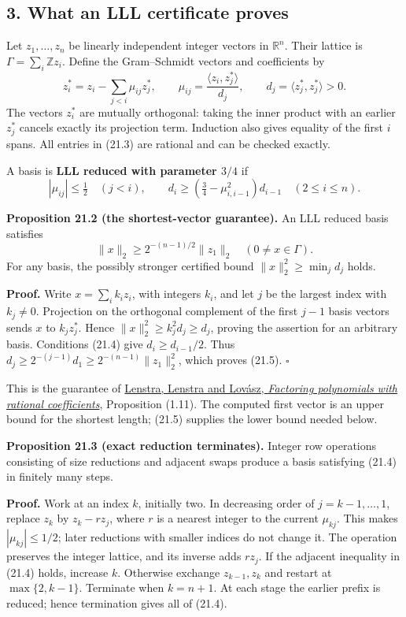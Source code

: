 \documentclass[
  11pt,
  a4paper,
]{article}
\begin{document}
\subsection{3. What an LLL certificate
proves}\label{what-an-lll-certificate-proves}

Let \(z_1,\ldots,z_n\) be linearly independent integer vectors in
\(\mathbb R^n\). Their lattice is \(\Gamma=\sum_i\mathbb Zz_i\). Define
the Gram--Schmidt vectors and coefficients by \[
 z_i^*=z_i-\sum_{j<i}\mu_{ij}z_j^*,\qquad
 \mu_{ij}=\frac{\langle z_i,z_j^*\rangle}{d_j},\qquad
 d_j=\langle z_j^*,z_j^*\rangle>0.
 \tag{21.3}
\] The vectors \(z_i^*\) are mutually orthogonal: taking the inner
product with an earlier \(z_j^*\) cancels exactly its projection term.
Induction also gives equality of the first \(i\) spans. All entries in
(21.3) are rational and can be checked exactly.

A basis is \textbf{LLL reduced with parameter \(3/4\)} if \[
 |\mu_{ij}|\le\tfrac12\quad(j<i),\qquad
 d_i\ge(\tfrac34-\mu_{i,i-1}^2)d_{i-1}\quad(2\le i\le n).
 \tag{21.4}
\]

\textbf{Proposition 21.2 (the shortest-vector guarantee).} An LLL
reduced basis satisfies \[
 \|x\|_2\ge2^{-(n-1)/2}\|z_1\|_2
       \quad(0\ne x\in\Gamma).
 \tag{21.5}
\] For any basis, the possibly stronger certified bound
\(\|x\|_2^2\ge\min_jd_j\) holds.

\textbf{Proof.} Write \(x=\sum_i k_i z_i\), with integers \(k_i\), and
let \(j\) be the largest index with \(k_j\ne0\). Projection on the
orthogonal complement of the first \(j-1\) basis vectors sends \(x\) to
\(k_jz_j^*\). Hence \(\|x\|_2^2\ge k_j^2d_j\ge d_j\), proving the
assertion for an arbitrary basis. Conditions (21.4) give
\(d_i\ge d_{i-1}/2\). Thus
\(d_j\ge2^{-(j-1)}d_1\ge2^{-(n-1)}\|z_1\|_2^2\), which proves (21.5).
\(\square\)

This is the guarantee of
\href{https://www.math.ucdavis.edu/~deloera/MISC/LA-BIBLIO/trunk/Lovasz/LovaszLenstraLenstrafactor.pdf}{Lenstra,
Lenstra and Lovász, \emph{Factoring polynomials with rational
coefficients}}, Proposition (1.11). The computed first vector is an
upper bound for the shortest length; (21.5) supplies the lower bound
needed below.

\textbf{Proposition 21.3 (exact reduction terminates).} Integer row
operations consisting of size reductions and adjacent swaps produce a
basis satisfying (21.4) in finitely many steps.

\textbf{Proof.} Work at an index \(k\), initially two. In decreasing
order of \(j=k-1,\ldots,1\), replace \(z_k\) by \(z_k-rz_j\), where
\(r\) is a nearest integer to the current \(\mu_{kj}\). This makes
\(|\mu_{kj}|\le1/2\); later reductions with smaller indices do not
change it. The operation preserves the integer lattice, and its inverse
adds \(rz_j\). If the adjacent inequality in (21.4) holds, increase
\(k\). Otherwise exchange \(z_{k-1},z_k\) and restart at
\(\max\{2,k-1\}\). Terminate when \(k=n+1\). At each stage the earlier
prefix is reduced; hence termination gives all of (21.4).
\end{document}
